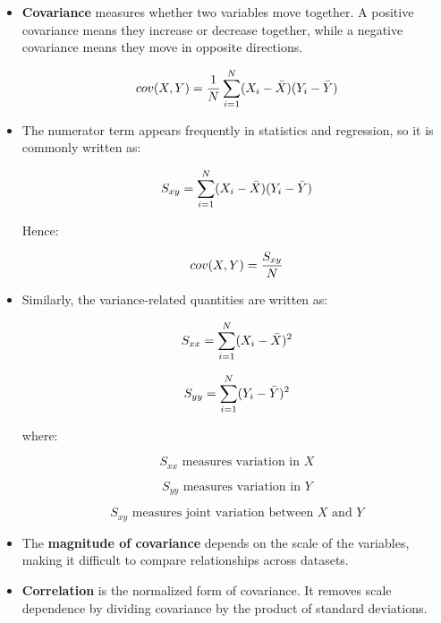 \documentclass[10pt,a4paper]{article}
\begin{document}
	\begin{itemize}
	
		\item \textbf{Covariance} measures whether two variables move together.
		A positive covariance means they increase or decrease together, while a negative covariance means they move in opposite directions.
	
		\begin{equation*}
			\Large
			cov(X,Y)
			=
			\frac{1}{N}
			\sum_{i=1}^{N}
			(X_i-\bar{X})(Y_i-\bar{Y})
		\end{equation*}
	
		\item The numerator term appears frequently in statistics and regression, so it is commonly written as:
	
		\begin{equation*}
			\Large
			S_{xy}
			=
			\sum_{i=1}^{N}
			(X_i-\bar{X})(Y_i-\bar{Y})
		\end{equation*}
	
		Hence:
	
		\begin{equation*}
			\Large
			cov(X,Y)
			=
			\frac{S_{xy}}{N}
		\end{equation*}
	
		\item Similarly, the variance-related quantities are written as:
	
		\begin{equation*}
			\Large
			S_{xx}
			=
			\sum_{i=1}^{N}
			(X_i-\bar{X})^2
		\end{equation*}
	
		\begin{equation*}
			\Large
			S_{yy}
			=
			\sum_{i=1}^{N}
			(Y_i-\bar{Y})^2
		\end{equation*}
	
		where:
	
		\[
		S_{xx} \text{ measures variation in } X
		\]
	
		\[
		S_{yy} \text{ measures variation in } Y
		\]
	
		\[
		S_{xy} \text{ measures joint variation between } X \text{ and } Y
		\]
	
		\item The \textbf{magnitude of covariance} depends on the scale of the variables, making it difficult to compare relationships across datasets.
	
		\item \textbf{Correlation} is the normalized form of covariance.
		It removes scale dependence by dividing covariance by the product of standard deviations.
	

\end{itemize}
\end{document}
